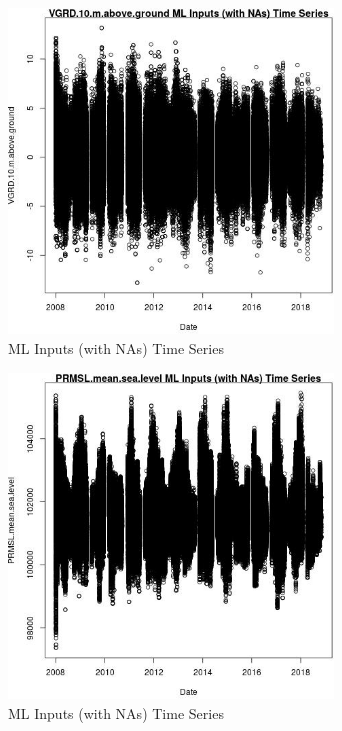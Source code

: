 \begin{figure} 
\centering  
\includegraphics[width=0.77\textwidth]{Code_Outputs/Report_ML_input_PM25_Step4_part_e_de_duplicated_aves_compiled_2019-05-20wNAs_VGRD10mabovegroundvDate.jpg} 
\caption{\label{fig:Report_ML_input_PM25_Step4_part_e_de_duplicated_aves_compiled_2019-05-20wNAsVGRD10mabovegroundvDate}ML Inputs (with NAs) Time Series} 
\end{figure} 
 

\begin{figure} 
\centering  
\includegraphics[width=0.77\textwidth]{Code_Outputs/Report_ML_input_PM25_Step4_part_e_de_duplicated_aves_compiled_2019-05-20wNAs_PRMSLmeansealevelvDate.jpg} 
\caption{\label{fig:Report_ML_input_PM25_Step4_part_e_de_duplicated_aves_compiled_2019-05-20wNAsPRMSLmeansealevelvDate}ML Inputs (with NAs) Time Series} 
\end{figure} 
 

